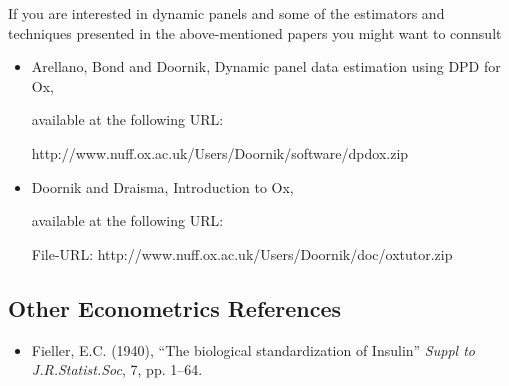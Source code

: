 \documentclass[landscape,letterpaper,9pt]{article}
\begin{document}
If you are interested in dynamic panels and some of the estimators and techniques presented in the above-mentioned papers
you might want to connsult

\begin{itemize}
\item Arellano, Bond and Doornik, Dynamic panel data estimation using DPD for Ox,

available at the following URL:

http://www.nuff.ox.ac.uk/Users/Doornik/software/dpdox.zip

\item Doornik and Draisma, Introduction to Ox,

available at the following URL:

File-URL: http://www.nuff.ox.ac.uk/Users/Doornik/doc/oxtutor.zip
\end{itemize}

\subsection{Other Econometrics References}
\begin{itemize}
\item Fieller, E.C. (1940), ``The biological standardization of Insulin''
\emph{Suppl to J.R.Statist.Soc}, 7, pp. 1--64.
\end{itemize}
\end{document}
